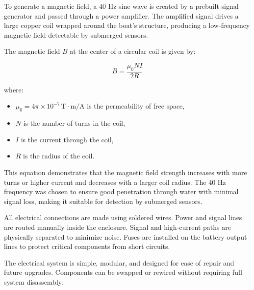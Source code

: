 To generate a magnetic field, a 40 Hz sine wave is created by a prebuilt signal generator and passed through a power amplifier. The amplified signal drives a large copper coil wrapped around the boat’s structure, producing a low-frequency magnetic field detectable by submerged sensors.

The magnetic field \( B \) at the center of a circular coil is given by:

\begin{equation}
B = \frac{\mu_0 N I}{2R}
\label{eq:bfield}
\end{equation}

where:
\begin{itemize}
    \item \( \mu_0 = 4\pi \times 10^{-7} \, \text{T}\cdot\text{m/A} \) is the permeability of free space,
    \item \( N \) is the number of turns in the coil,
    \item \( I \) is the current through the coil,
    \item \( R \) is the radius of the coil.
\end{itemize}

This equation demonstrates that the magnetic field strength increases with more turns or higher current and decreases with a larger coil radius. The 40 Hz frequency was chosen to ensure good penetration through water with minimal signal loss, making it suitable for detection by submerged sensors.

All electrical connections are made using soldered wires. Power and signal lines are routed manually inside the enclosure. Signal and high-current paths are physically separated to minimize noise. Fuses are installed on the battery output lines to protect critical components from short circuits.

The electrical system is simple, modular, and designed for ease of repair and future upgrades. Components can be swapped or rewired without requiring full system disassembly.